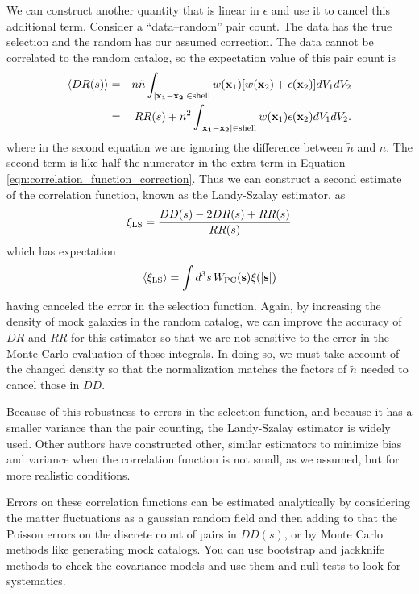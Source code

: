 We can construct another quantity that is linear in $\epsilon$ and use it to cancel this additional term.  Consider a ``data--random'' pair count.  The data has the true selection and the random has our assumed correction.  The data cannot be correlated to the random catalog, so the expectation value of this pair count is 
\begin{eqnarray}
  \langle DR(s) \rangle &=& n\tilde n \int_{|\mathbf{x_1 - x_2}| \in \mbox{\scriptsize shell}} w(\mathbf x_1) [w(\mathbf x_2) + \epsilon(\mathbf x_2) ] dV_1 dV_2  \\
  &=& RR(s) +  n^2 \int_{|\mathbf{x_1 - x_2}| \in \mbox{\scriptsize shell}} w(\mathbf x_1) \epsilon(\mathbf x_2) dV_1 dV_2.
\end{eqnarray}
where in the second equation we are ignoring the difference between $\tilde n$ and $n$.
The second term is like half the numerator in the extra term in Equation \ref{eqn:correlation_function_correction}.  Thus we can construct a second estimate of the correlation function, known as the Landy-Szalay estimator, as
\begin{equation}
 \xi_{\rm LS} =  \frac{DD(s) - 2 DR(s) + RR(s)}{RR(s)}  
\end{equation}
which has expectation 
\begin{equation}
 \langle \xi_{\rm LS}  \rangle =   \int d^3s\, W_{\rm PC}(\mathbf s)  \xi(|\mathbf{s}|)
\end{equation}
having canceled the error in the selection function.  Again, by increasing the density of mock galaxies in the random catalog, we can improve the accuracy of $DR$ and $RR$ for this estimator so that we are not sensitive to the error in the Monte Carlo evaluation of those integrals.  In doing so, we must take account of the changed density so that the normalization matches the factors of $\tilde n$ needed to cancel those in $DD$. 

Because of this robustness to errors in the selection function, and because it has a smaller variance than the pair counting, the Landy-Szalay estimator is widely used.  Other authors have constructed other, similar estimators to minimize bias and variance when the correlation function is not small, as we assumed, but for more realistic conditions.

Errors on these correlation functions can be estimated analytically by considering the matter fluctuations as a gaussian random field and then adding to that the Poisson errors on the discrete count of pairs in $DD(s)$, or by Monte Carlo methods like generating mock catalogs.  You can use bootstrap and jackknife methods to check the covariance models and use them and null tests to look for systematics.


